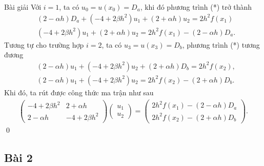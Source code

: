 \documentclass[9pt]{beamer}
\begin{document}
\begin{frame}
    \begin{exampleblock}{Bài giải}
    Với $i = 1$, ta có $u_0 = u(x_0) = D_a$, khi đó phương trình (*) trở thành
    \begin{align*}
        & (2 - \alpha h) D_a + (-4 + 2\beta h^2) u_1 + (2 + \alpha h) u_2 = 2h^2f(x_1) \\
        & (-4 + 2\beta h^2) u_1 + (2 + \alpha h) u_2 = 2h^2f(x_1) - (2 - \alpha h) D_a.
    \end{align*}
    Tương tự cho trường hợp $i = 2$, ta có $u_3 = u(x_3) = D_b$, phương trình (*) tương đương
    \begin{align*}
        & (2 - \alpha h) u_1 + (-4 + 2\beta h^2) u_2 + (2 + \alpha h) D_b = 2h^2f(x_2), \\
        & (2 - \alpha h) u_1 + (-4 + 2\beta h^2) u_2 = 2h^2f(x_2) - (2 + \alpha h) D_b.
    \end{align*}
    Khi đó, ta rút được công thức ma trận như sau
    \begin{align*}
        \begin{pmatrix}
            -4 + 2\beta h^2 & 2 + \alpha h \\
            2 - \alpha h & -4 + 2\beta h^2
        \end{pmatrix}
        \begin{pmatrix} u_1 \\ u_2 \end{pmatrix}
        = \begin{pmatrix}
            2h^2 f(x_1) - (2 - \alpha h) D_a \\
            2h^2 f(x_2) - (2 + \alpha h) D_b
        \end{pmatrix}.
    \end{align*} \hfill \qed
    \end{exampleblock}
\end{frame}

\subsection{Bài 2}
\end{document}
